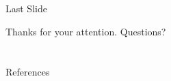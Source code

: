 
\section*{}

\begin{frame}{Last Slide}

{\centering

Thanks for your attention. Questions?

}

\end{frame}

\section*{}

\begin{frame}[allowframebreaks]{References}
\footnotesize


\end{frame}






